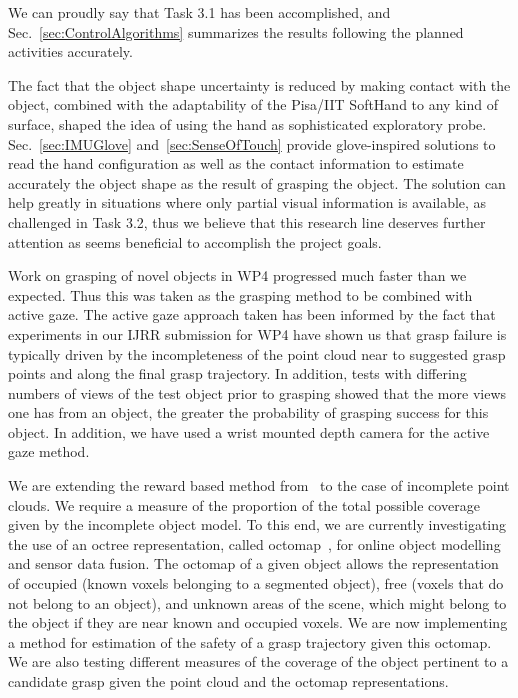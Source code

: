 \documentclass[a4paper,11pt,pdf]{pacmanreport}
\begin{document}
We can proudly say that Task 3.1 has been accomplished, and Sec.~\ref{sec:ControlAlgorithms} summarizes the results following the planned activities accurately.


The fact that the object shape uncertainty is reduced by making contact with the object, combined with the adaptability of the Pisa/IIT SoftHand to any kind of surface, shaped the idea of using the hand as sophisticated exploratory probe. Sec.~\ref{sec:IMUGlove} and~\ref{sec:SenseOfTouch} provide glove-inspired solutions to read the hand configuration as well as the contact information to estimate accurately the object shape as the result of grasping the object. The solution can help greatly in situations where only partial visual information is available, as challenged in Task 3.2, thus we believe that this research line deserves further attention as seems beneficial to accomplish the project goals.

Work on grasping of novel objects in WP4 progressed much faster than we expected. Thus this was taken as the grasping method to be combined with active gaze. The active gaze approach taken has been informed by the fact that experiments in our IJRR submission for WP4 have shown us that grasp failure is typically driven by the incompleteness of the point cloud near to suggested grasp points and along the final grasp trajectory. In addition, tests with differing numbers of views of the test object prior to grasping showed that the more views one has from an object, the greater the probability of grasping success for this object. In addition, we have used a wrist mounted depth camera for the active gaze method.

We are extending the reward based method from~\cite{nunez2013models} to the case of incomplete point clouds. We require a measure of the proportion of the total possible coverage given by the incomplete object model. To this end, we are currently investigating the use of an octree representation, called octomap~\cite{hornung13auro}, for online object modelling and sensor data fusion. The octomap of a given object allows the representation of occupied (known voxels belonging to a segmented object), free (voxels that do not belong to an object), and unknown areas of the scene, which might belong to the object if they are near known and occupied voxels. We are now implementing a method for estimation of the safety of a grasp trajectory given this octomap. We are also testing different measures of the coverage of the object pertinent to a candidate grasp given the point cloud and the octomap representations.
\end{document}
